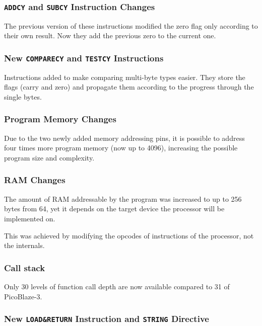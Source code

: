         \subsubsection{\texttt{ADDCY} and \texttt{SUBCY} Instruction Changes}

        The previous version of these instructions modified the zero flag only according to their own result. Now they add the previous zero to the current one.

        \subsubsection{New \texttt{COMPARECY} and \texttt{TESTCY} Instructions}

        Instructions added to make comparing multi-byte types easier. They store the flags (carry and zero) and propagate them according to the progress through the single bytes.

        \subsubsection{Program Memory Changes}

        Due to the two newly added memory addressing pins, it is possible to address four times more program memory (now up to 4096), increasing the possible program size and complexity.

        \subsubsection{RAM Changes}

        The amount of RAM addressable by the program was increased to up to 256 bytes from 64, yet it depends on the target device the processor will be implemented on. 

        This was achieved by modifying the opcodes of instructions of the processor, not the internals.

        \subsubsection{Call stack}

        Only 30 levels of function call depth are now available compared to 31 of PicoBlaze-3.

        \subsubsection{New \texttt{LOAD\&RETURN} Instruction and \texttt{STRING} Directive}

